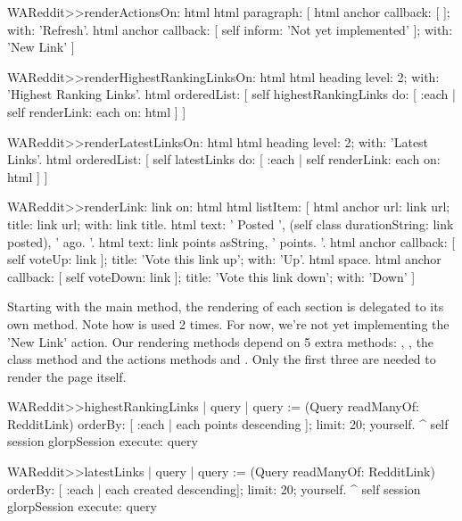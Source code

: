\documentclass[a4paper,10pt,twoside]{book}
\begin{document}
\begin{code}{}
WAReddit>>renderActionsOn: html
    html paragraph: [ html anchor callback: [ ]; with: 'Refresh'. 
    html anchor callback: [ self inform: 'Not yet implemented' ]; with: 'New Link' ]
\end{code}

\begin{code}{}
WAReddit>>renderHighestRankingLinksOn: html
    html heading level: 2; with: 'Highest Ranking Links'. 
    html orderedList: [
          self highestRankingLinks do: [ :each | self renderLink: each on: html ] ]
\end{code}

\begin{code}{}
WAReddit>>renderLatestLinksOn: html
    html heading level: 2; with: 'Latest Links'. 
    html orderedList: [
         self latestLinks do: [ :each | self renderLink: each on: html ] ]
\end{code}

\begin{code}{}
WAReddit>>renderLink: link on: html
    html listItem: [ html anchor url: link url; title: link url; with: link title.   
    html text: ' Posted ', (self class durationString: link posted), ' ago. '. 
    html text: link points asString, ' points. '. 
    html anchor 
         callback: [ self voteUp: link ]; 
         title: 'Vote this link up'; 
         with: 'Up'. 
    html space. 
    html anchor 
         callback: [ self voteDown: link ]; 
         title: 'Vote this link down'; with: 'Down' ]
\end{code}

Starting with the main  method, the rendering of each section is delegated to its own method. Note how  is used 2 times. For now, we're not yet implementing the 'New Link' action. Our rendering methods depend on 5 extra methods: , , the class method  and the actions methods  and . Only the first three are needed to render the page itself.

\begin{code}{}
WAReddit>>highestRankingLinks
   | query | 
   query := (Query readManyOf: RedditLink)
              orderBy: [ :each | each points descending ]; limit: 20; yourself.
   ^ self session glorpSession execute: query
\end{code}

\begin{code}{}
WAReddit>>latestLinks
   | query | 
   query := (Query readManyOf: RedditLink)
              orderBy: [ :each | each created descending]; limit: 20; yourself.
   ^ self session glorpSession execute: query
\end{code}
\end{document}

